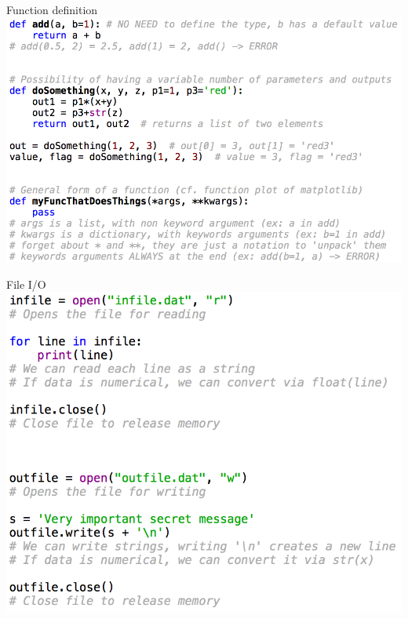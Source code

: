 \documentclass[11pt,unknownkeysallowed,usenames,dvipsnames]{beamer}
\begin{document}
%    
\begin{frame}{Function definition}
    \includegraphics[width=\linewidth]{code-functions}
\end{frame}
   

\begin{frame}{File I/O}
	\includegraphics[width=0.8\linewidth]{code-fileio}
\end{frame}
\end{document}
